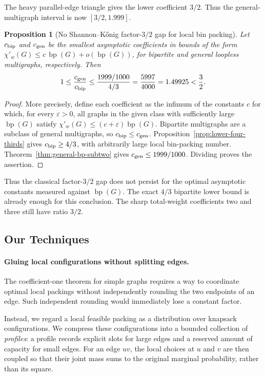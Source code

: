 \documentclass[11pt]{article}
\newtheorem{proposition}[theorem]{Proposition}
\theoremstyle{definition}\newtheorem{algorithm}{Algorithm}[section]
\numberwithin{equation}{section}
\theoremstyle{remark}\newtheorem*{remark}{Remark}
\newcommand{\bp}{\operatorname{bp}}
\newcommand{\akr}[1]{\todo[color=red!100!black!50]{AK: #1}}
\newcommand{\akr}[1]{}
\begin{document}
The heavy parallel-edge triangle gives the lower coefficient $3/2$.
Thus the general-multigraph interval is now $[3/2,1.999]$.

\begin{proposition}[No Shannon--K\H{o}nig factor-$3/2$ gap for local bin packing]
\label{prop:bp-konig-shannon-gap}
Let $c_{\rm bip}$ and $c_{\rm gen}$ be the smallest asymptotic
coefficients in bounds of the form
$\chi'_w(G)\le c\,\bp(G)+o(\bp(G))$, for bipartite and general
loopless multigraphs, respectively. Then
\[
 1\le\frac{c_{\rm gen}}{c_{\rm bip}}
 \le\frac{1999/1000}{4/3}
 =\frac{5997}{4000}=1.49925<\frac32.
\]
\end{proposition}
\begin{proof}
More precisely, define each coefficient as the infimum of the constants
$c$ for which, for every $\varepsilon>0$, all graphs in the given
class with sufficiently large $\bp(G)$ satisfy
$\chi'_w(G)\le(c+\varepsilon)\bp(G)$.
Bipartite multigraphs are a subclass of general multigraphs, so
$c_{\rm bip}\le c_{\rm gen}$. Proposition~\ref{prop:lower-four-thirds}
gives $c_{\rm bip}\ge4/3$, with arbitrarily large local bin-packing
number. Theorem~\ref{thm:general-bp-subtwo} gives
$c_{\rm gen}\le1999/1000$. Dividing proves the assertion.
\end{proof}

Thus the classical factor-$3/2$ gap does not persist for the optimal
asymptotic constants measured against $\bp(G)$. The exact $4/3$
bipartite lower bound is already enough for this conclusion. The
sharp total-weight coefficients two and three still have ratio $3/2$.

\subsection{Our Techniques}
\akr{need to rewrite}
\paragraph{Gluing local configurations without splitting edges.}
The coefficient-one theorem for simple graphs requires a way to coordinate optimal local packings without independently rounding the two endpoints of an edge.  Such independent rounding would immediately lose a constant factor.

Instead, we regard a local feasible packing as a distribution over knapsack configurations.  We compress these configurations into a bounded collection of \emph{profiles}: a profile records explicit slots for large edges and a reserved amount of capacity for small edges.  For an edge $uv$, the local choices at $u$ and $v$ are then coupled so that their joint mass sums to the original marginal probability, rather than its square.
\end{document}
